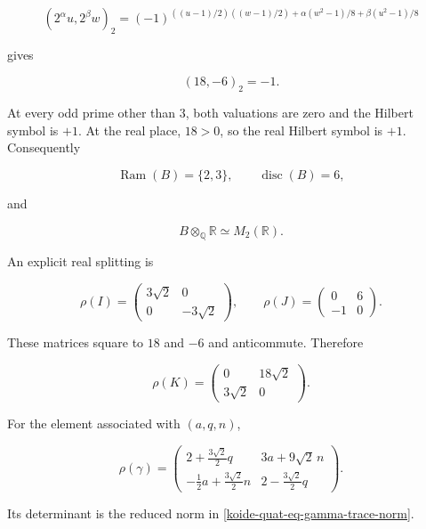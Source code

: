 \[
 (2^\alpha u,2^\beta w)_2
 =(-1)^{
 ((u-1)/2)((w-1)/2)
 +\alpha(w^2-1)/8+\beta(u^2-1)/8}
\]

gives

\begin{equation}\label{koide-quat-eq-hilbert-two}
 (18,-6)_2=-1.
\end{equation}

At every odd prime other than \(3\), both valuations are zero and the Hilbert symbol is \(+1\). At the real place, \(18>0\), so the real Hilbert symbol is \(+1\). Consequently

\begin{equation}\label{koide-quat-eq-ramification-discriminant}
 \operatorname{Ram}(B)=\{2,3\},\qquad
 \operatorname{disc}(B)=6,
\end{equation}

and

\[
 B\otimes_{\mathbb Q}\mathbb R\simeq M_2(\mathbb R).
\]

An explicit real splitting is

\begin{equation}\label{koide-quat-eq-real-splitting}
 \rho(I)=
 \begin{pmatrix}3\sqrt2&0\\0&-3\sqrt2\end{pmatrix},
 \qquad
 \rho(J)=
 \begin{pmatrix}0&6\\-1&0\end{pmatrix}.
\end{equation}

These matrices square to \(18\) and \(-6\) and anticommute. Therefore

\[
 \rho(K)=
 \begin{pmatrix}0&18\sqrt2\\3\sqrt2&0\end{pmatrix}.
\]

For the element associated with \((a,q,n)\),

\begin{equation}\label{koide-quat-eq-gamma-matrix}
 \rho(\gamma)=
 \begin{pmatrix}
 2+\frac{3\sqrt2}{2}q&3a+9\sqrt2\,n\\
 -\frac12a+\frac{3\sqrt2}{2}n&
 2-\frac{3\sqrt2}{2}q
 \end{pmatrix}.
\end{equation}

Its determinant is the reduced norm in \eqref{koide-quat-eq-gamma-trace-norm}.

